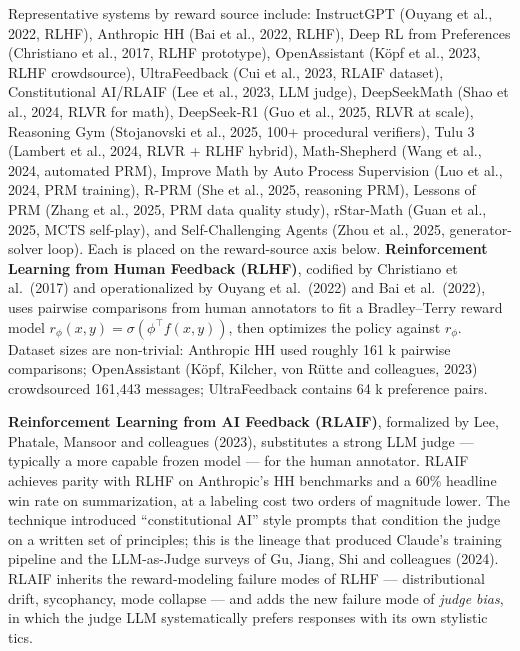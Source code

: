 Representative systems by reward source include: InstructGPT (Ouyang et al., 2022, RLHF), Anthropic HH (Bai et al., 2022, RLHF), Deep RL from Preferences (Christiano et al., 2017, RLHF prototype), OpenAssistant (Köpf et al., 2023, RLHF crowdsource), UltraFeedback (Cui et al., 2023, RLAIF dataset), Constitutional AI/RLAIF (Lee et al., 2023, LLM judge), DeepSeekMath (Shao et al., 2024, RLVR for math), DeepSeek-R1 (Guo et al., 2025, RLVR at scale), Reasoning Gym (Stojanovski et al., 2025, 100+ procedural verifiers), Tulu 3 (Lambert et al., 2024, RLVR + RLHF hybrid), Math-Shepherd (Wang et al., 2024, automated PRM), Improve Math by Auto Process Supervision (Luo et al., 2024, PRM training), R-PRM (She et al., 2025, reasoning PRM), Lessons of PRM (Zhang et al., 2025, PRM data quality study), rStar-Math (Guan et al., 2025, MCTS self-play), and Self-Challenging Agents (Zhou et al., 2025, generator-solver loop). Each is placed on the reward-source axis below. \textbf{Reinforcement Learning from Human Feedback (RLHF)}, codified by Christiano et al.~(2017) and operationalized by Ouyang et al.~(2022) and Bai et al.~(2022), uses pairwise comparisons from human annotators to fit a Bradley--Terry reward model \(r_\phi(x, y) = \sigma(\phi^\top f(x,y))\), then optimizes the policy against \(r_\phi\). Dataset sizes are non-trivial: Anthropic HH used roughly 161 k pairwise comparisons; OpenAssistant (Köpf, Kilcher, von Rütte and colleagues, 2023) crowdsourced 161,443 messages; UltraFeedback contains 64 k preference pairs.

\textbf{Reinforcement Learning from AI Feedback (RLAIF)}, formalized by Lee, Phatale, Mansoor and colleagues (2023), substitutes a strong LLM judge --- typically a more capable frozen model --- for the human annotator. RLAIF achieves parity with RLHF on Anthropic's HH benchmarks and a 60\% headline win rate on summarization, at a labeling cost two orders of magnitude lower. The technique introduced ``constitutional AI'' style prompts that condition the judge on a written set of principles; this is the lineage that produced Claude's training pipeline and the LLM-as-Judge surveys of Gu, Jiang, Shi and colleagues (2024). RLAIF inherits the reward-modeling failure modes of RLHF --- distributional drift, sycophancy, mode collapse --- and adds the new failure mode of \emph{judge bias}, in which the judge LLM systematically prefers responses with its own stylistic tics.

